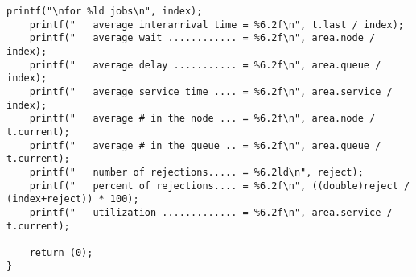 \begin{lstlisting}[style=CStyle]
    printf("\nfor %ld jobs\n", index);
    printf("   average interarrival time = %6.2f\n", t.last / index);
    printf("   average wait ............ = %6.2f\n", area.node / index);
    printf("   average delay ........... = %6.2f\n", area.queue / index);
    printf("   average service time .... = %6.2f\n", area.service / index);
    printf("   average # in the node ... = %6.2f\n", area.node / t.current);
    printf("   average # in the queue .. = %6.2f\n", area.queue / t.current);
	printf("   number of rejections..... = %6.2ld\n", reject);
	printf("   percent of rejections.... = %6.2f\n", ((double)reject / (index+reject)) * 100);
    printf("   utilization ............. = %6.2f\n", area.service / t.current);

    return (0);
}
\end{lstlisting}
